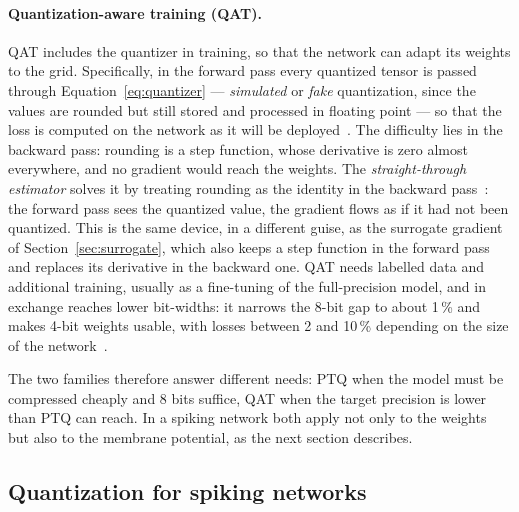 \paragraph{Quantization-aware training (QAT).} QAT includes the quantizer in
training, so that the network can adapt its weights to the grid. Specifically, in the forward pass every quantized tensor is
passed through Equation~\ref{eq:quantizer} --- \emph{simulated} or
\emph{fake} quantization, since the values are rounded but still stored and
processed in floating point --- so that the loss is computed on the network as
it will be deployed~\cite{jacob2018quantization}. The difficulty lies in the backward
pass: rounding is a step function, whose derivative is zero almost everywhere,
and no gradient would reach the weights. The \emph{straight-through estimator}
solves it by treating rounding as the identity in the backward
pass~\cite{bengio2013ste}: the forward pass sees the quantized value, the
gradient flows as if it had not been quantized. This is the same device, in a
different guise, as the surrogate gradient of Section~\ref{sec:surrogate}, which
also keeps a step function in the forward pass and replaces its derivative in
the backward one. QAT needs labelled data and additional training, usually as a
fine-tuning of the full-precision model, and in exchange reaches lower
bit-widths: it narrows the 8-bit gap to about 1\,\% and makes 4-bit weights
usable, with losses between 2 and 10\,\% depending on the size of the
network~\cite{krishnamoorthi2018whitepaper, nagel2021whitepaper}.

The two families therefore answer different needs: PTQ when the model must be
compressed cheaply and 8 bits suffice, QAT when the target precision is lower
than PTQ can reach. In a spiking network both apply not only to the weights but
also to the membrane potential, as the next section describes.

\subsection{Quantization for spiking networks}

